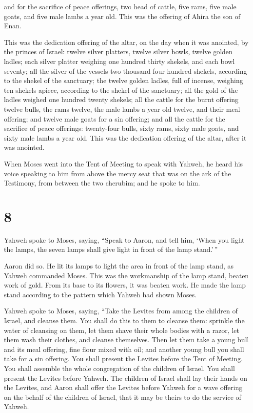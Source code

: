  and for the sacrifice of peace offerings, two head of
cattle, five rams, five male goats, and five male lambs a year old. This
was the offering of Ahira the son of Enan.

 This was the dedication offering of the altar, on the
day when it was anointed, by the princes of Israel: twelve silver
platters, twelve silver bowls, twelve golden ladles; 
each silver platter weighing one hundred thirty shekels, and each bowl
seventy; all the silver of the vessels two thousand four hundred
shekels, according to the shekel of the sanctuary;  the
twelve golden ladles, full of incense, weighing ten shekels apiece,
according to the shekel of the sanctuary; all the gold of the ladles
weighed one hundred twenty shekels;  all the cattle for
the burnt offering twelve bulls, the rams twelve, the male lambs a year
old twelve, and their meal offering; and twelve male goats for a sin
offering;  and all the cattle for the sacrifice of peace
offerings: twenty-four bulls, sixty rams, sixty male goats, and sixty
male lambs a year old. This was the dedication offering of the altar,
after it was anointed.

 When Moses went into the Tent of Meeting to speak with
Yahweh, he heard his voice speaking to him from above the mercy seat
that was on the ark of the Testimony, from between the two cherubim; and
he spoke to him.

\hypertarget{section-7}{%
\section{8}\label{section-7}}

 Yahweh spoke to Moses, saying,  ``Speak to
Aaron, and tell him, `When you light the lamps, the seven lamps shall
give light in front of the lamp stand.'\,''

 Aaron did so. He lit its lamps to light the area in front
of the lamp stand, as Yahweh commanded Moses.  This was
the workmanship of the lamp stand, beaten work of gold. From its base to
its flowers, it was beaten work. He made the lamp stand according to the
pattern which Yahweh had shown Moses.

 Yahweh spoke to Moses, saying,  ``Take the
Levites from among the children of Israel, and cleanse them.
 You shall do this to them to cleanse them: sprinkle the
water of cleansing on them, let them shave their whole bodies with a
razor, let them wash their clothes, and cleanse themselves.
 Then let them take a young bull and its meal offering,
fine flour mixed with oil; and another young bull you shall take for a
sin offering.  You shall present the Levites before the
Tent of Meeting. You shall assemble the whole congregation of the
children of Israel.  You shall present the Levites before
Yahweh. The children of Israel shall lay their hands on the Levites,
 and Aaron shall offer the Levites before Yahweh for a
wave offering on the behalf of the children of Israel, that it may be
theirs to do the service of Yahweh.

